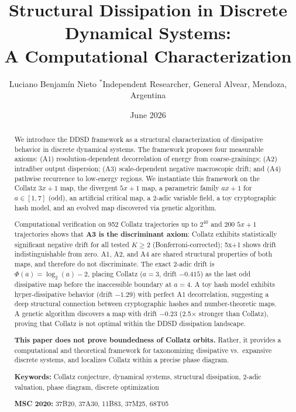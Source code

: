 \documentclass[11pt,a4paper]{article}
\title{Structural Dissipation in Discrete Dynamical Systems:\\ A Computational Characterization}
\author{Luciano Benjamín Nieto
{\small $^*$Independent Researcher, General Alvear, Mendoza, Argentina}\\
}
\date{June 2026}
\theoremstyle{plain}
\theoremstyle{definition}
\theoremstyle{remark}
\begin{document}
\maketitle

\begin{abstract}
We introduce the DDSD framework as a structural characterization of dissipative behavior in discrete dynamical systems. The framework proposes four measurable axioms: (A1) resolution-dependent decorrelation of energy from coarse-grainings; (A2) intrafiber output dispersion; (A3) scale-dependent negative macroscopic drift; and (A4) pathwise recurrence to low-energy regions. We instantiate this framework on the Collatz $3x+1$ map, the divergent $5x+1$ map, a parametric family $ax+1$ for $a \in [1,7]$ (odd), an artificial critical map, a 2-adic variable field, a toy cryptographic hash model, and an evolved map discovered via genetic algorithm.

Computational verification on 952 Collatz trajectories up to $2^{40}$ and 200 $5x+1$ trajectories shows that \textbf{A3 is the discriminant axiom}: Collatz exhibits statistically significant negative drift for all tested $K \geq 2$ (Bonferroni-corrected); 5x+1 shows drift indistinguishable from zero. A1, A2, and A4 are shared structural properties of both maps, and therefore do not discriminate. The exact 2-adic drift is $\Phi(a) = \log_2(a) - 2$, placing Collatz ($a=3$, drift $-0.415$) as the last odd dissipative map before the inaccessible boundary at $a=4$. A toy hash model exhibits hyper-dissipative behavior (drift $-1.29$) with perfect A1 decorrelation, suggesting a deep structural connection between cryptographic hashes and number-theoretic maps. A genetic algorithm discovers a map with drift $-0.23$ (2.5$\times$ stronger than Collatz), proving that Collatz is not optimal within the DDSD dissipation landscape.

\textbf{This paper does not prove boundedness of Collatz orbits.} Rather, it provides a computational and theoretical framework for taxonomizing dissipative vs.\ expansive discrete systems, and localizes Collatz within a precise phase diagram.

\vspace{0.5cm}
\noindent
\textbf{Keywords:} Collatz conjecture, dynamical systems, structural dissipation, 2-adic valuation, phase diagram, discrete optimization

\noindent
\textbf{MSC 2020:} 37B20, 37A30, 11B83, 37M25, 68T05
\end{abstract}
\end{document}
